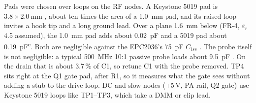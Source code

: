 \documentclass[11pt,letterpaper]{article}
\newcommand{\est}{\textsuperscript{e}}
\begin{document}
Pads were chosen over loops on the RF nodes. A Keystone 5019 pad is $3.8\times\SI{2.0}{\milli\meter}$ \cite{kicadTP,keystone5019}, about ten times the area of a \SI{1.0}{\milli\meter} pad, and its raised loop invites a hook tip and a long ground lead. Over a plane \SI{1.6}{\milli\meter} below (FR-4, $\varepsilon_r$ 4.5 assumed), the \SI{1.0}{\milli\meter} pad adds about \SI{0.02}{\pico\farad} and a 5019 pad about \SI{0.19}{\pico\farad}\est. Both are negligible against the EPC2036's \SI{75}{\pico\farad} $C_{iss}$ \cite{epc2036ds}. The probe itself is not negligible: a typical \SI{500}{\mega\hertz} 10:1 passive probe loads about \SI{9.5}{\pico\farad} \cite{picoTA133}. On the drain that is about 3.7\,\% of C1, so retune C1 with the probe removed. TP4 sits right at the Q1 gate pad, after R1, so it measures what the gate sees without adding a stub to the drive loop. DC and slow nodes (+5\,V, PA rail, Q2 gate) use Keystone 5019 loops like TP1--TP3, which take a DMM or clip lead.
\end{document}
